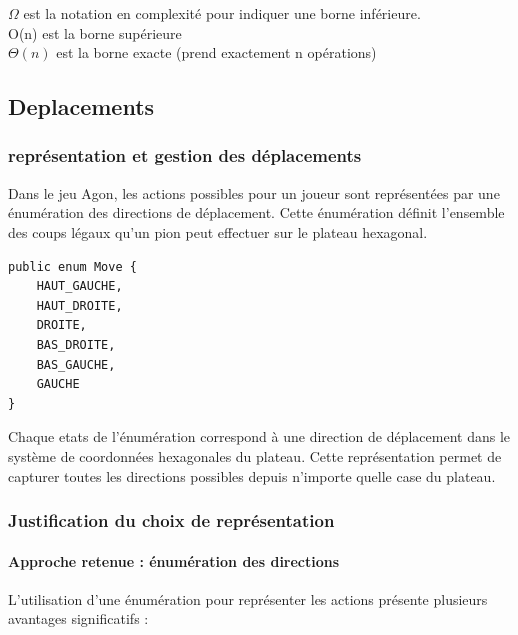 \documentclass[10pt]{article} %
\begin{document}
$\Omega$ est la notation en complexité pour indiquer une borne inférieure. \\
O(n) est la borne supérieure \\
$\Theta(n)$ est la borne exacte (prend exactement n opérations) \\


\subsection{Deplacements}
\subsubsection{représentation et gestion des déplacements}

Dans le jeu Agon, les actions possibles pour un joueur sont représentées par une énumération des directions de déplacement. Cette énumération définit l'ensemble des coups légaux qu'un pion peut effectuer sur le plateau hexagonal.

\begin{minipage}[t]{0.45\textwidth}
\begin{verbatim}
public enum Move {
    HAUT_GAUCHE,
    HAUT_DROITE,
    DROITE,
    BAS_DROITE,
    BAS_GAUCHE,
    GAUCHE
}

\end{verbatim}
\end{minipage}
\hfill

\vspace{0.5em}

Chaque etats de l'énumération correspond à une direction de déplacement dans le système de coordonnées hexagonales du plateau. Cette représentation permet de capturer toutes les directions possibles depuis n'importe quelle case du plateau.

\subsubsection{Justification du choix de représentation}

\paragraph{Approche retenue : énumération des directions}

L'utilisation d'une énumération pour représenter les actions présente plusieurs avantages significatifs :
\end{document}
